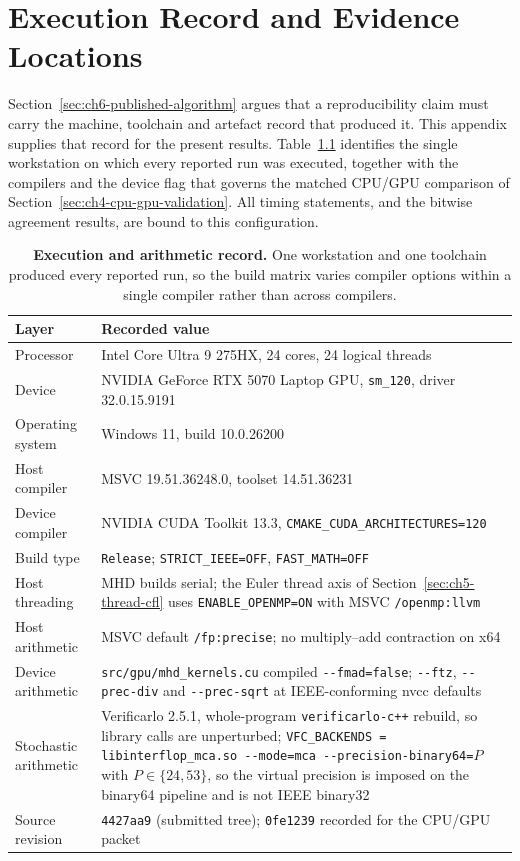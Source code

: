\chapter{Execution Record and Evidence Locations}
\label{sec:appendix-provenance}

Section~\ref{sec:ch6-published-algorithm} argues that a reproducibility claim
must carry the machine, toolchain and artefact record that produced it. This
appendix supplies that record for the present results.
Table~\ref{tab:appendix-platform} identifies the single workstation on which
every reported run was executed, together with the compilers and the device
flag that governs the matched CPU/GPU comparison of
Section~\ref{sec:ch4-cpu-gpu-validation}. All timing statements, and the
bitwise agreement results, are bound to this configuration.

\begin{table}[htbp]
\centering
\small
\begin{tabularx}{\textwidth}{@{}lX@{}}
\toprule
Layer & Recorded value \\
\midrule
Processor & Intel Core Ultra 9 275HX, 24 cores, 24 logical threads \\
Device & NVIDIA GeForce RTX 5070 Laptop GPU, \texttt{sm\_120}, driver 32.0.15.9191 \\
Operating system & Windows 11, build 10.0.26200 \\
Host compiler & MSVC 19.51.36248.0, toolset 14.51.36231 \\
Device compiler & NVIDIA CUDA Toolkit 13.3, \texttt{CMAKE\_CUDA\_ARCHITECTURES=120} \\
Build type & \texttt{Release}; \texttt{STRICT\_IEEE=OFF}, \texttt{FAST\_MATH=OFF} \\
Host threading & MHD builds serial; the Euler thread axis of
  Section~\ref{sec:ch5-thread-cfl} uses \texttt{ENABLE\_OPENMP=ON} with MSVC
  \texttt{/openmp:llvm} \\
Host arithmetic & MSVC default \texttt{/fp:precise}; no multiply--add contraction on x64 \\
Device arithmetic & \texttt{src/gpu/mhd\_kernels.cu} compiled \texttt{-{}-fmad=false};
  \texttt{-{}-ftz}, \texttt{-{}-prec-div} and \texttt{-{}-prec-sqrt} at IEEE-conforming
  nvcc defaults \\
Stochastic arithmetic & Verificarlo 2.5.1, whole-program
  \texttt{verificarlo-c++} rebuild, so library calls are unperturbed;
  \texttt{VFC\_BACKENDS = libinterflop\_mca.so -{}-mode=mca
  -{}-precision-binary64=$P$} with $P\in\{24,53\}$, so the virtual precision is
  imposed on the binary64 pipeline and is not IEEE binary32 \\
Source revision & \texttt{4427aa9} (submitted tree); \texttt{0fe1239} recorded for the
  CPU/GPU packet \\
\bottomrule
\end{tabularx}
\caption[Execution and arithmetic record]{\textbf{Execution and arithmetic
record.} One workstation and one toolchain produced every reported run, so the
build matrix varies compiler options within a single compiler rather than
across compilers.}
\label{tab:appendix-platform}
\end{table}

